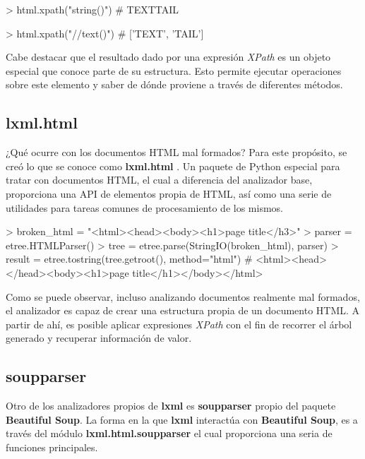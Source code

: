 \begin{Schunk}
    \begin{Soutput}
        > html.xpath("string()")
        # TEXTTAIL

        > html.xpath("//text()")
        # ['TEXT', 'TAIL']
    \end{Soutput}
\end{Schunk}

Cabe destacar que el resultado dado por una expresión \emph{XPath} es un objeto especial que conoce parte de su
estructura. Esto permite ejecutar operaciones sobre este elemento y saber de dónde proviene a través de
diferentes métodos.

\subsection{lxml.html}
\label{subsec:lxml.html}

¿Qué ocurre con los documentos HTML mal formados? Para este propósito, se creó lo que se conoce como
\textbf{lxml.html} \cite{lxml}. Un paquete de Python especial para tratar con documentos HTML, el cual 
a diferencia del analizador base, proporciona una API de elementos propia de HTML, así como una serie de 
utilidades para tareas comunes de procesamiento de los mismos.

\begin{Schunk}
    \begin{Soutput}
        > broken_html = "<html><head><body><h1>page title</h3>"
        > parser = etree.HTMLParser()
        > tree   = etree.parse(StringIO(broken_html), parser)
        > result = etree.tostring(tree.getroot(), method="html")
        # <html><head></head><body><h1>page title</h1></body></html>
    \end{Soutput}
\end{Schunk}

Como se puede observar, incluso analizando documentos realmente mal formados, el analizador es capaz de
crear una estructura propia de un documento HTML. A partir de ahí, es posible aplicar expresiones 
\emph{XPath} con el fin de recorrer el árbol generado y recuperar información de valor.

\subsection{soupparser}
\label{subsec:soupparser}

Otro de los analizadores propios de \textbf{lxml} es \textbf{soupparser} \cite{lxml} propio del paquete
\textbf{Beautiful Soup}. La forma en la que \textbf{lxml} interactúa con \textbf{Beautiful Soup}, es a 
través del módulo \textbf{lxml.html.soupparser} el cual proporciona una seria de funciones principales. 

